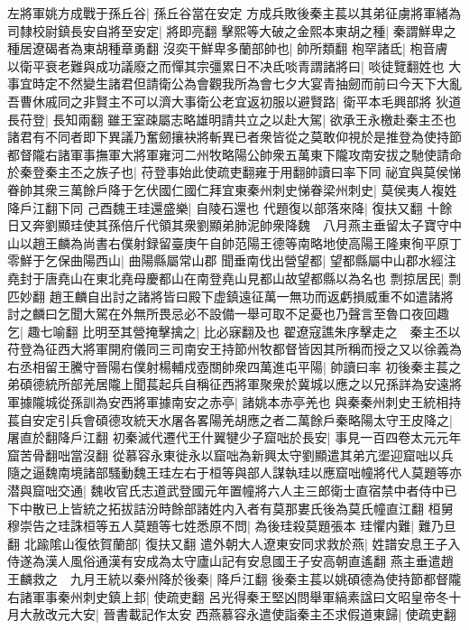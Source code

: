 左將軍姚方成戰于孫丘谷|{
	孫丘谷當在安定}
方成兵敗後秦主萇以其弟征虜將軍緒為司隸校尉鎮長安自將至安定|{
	將即亮翻}
擊熙等大破之金熙本東胡之種|{
	秦謂鮮卑之種居遼碣者為東胡種章勇翻}
沒奕干鮮卑多蘭部帥也|{
	帥所類翻}
枹罕諸氐|{
	枹音膚}
以衛平衰老難與成功議廢之而憚其宗彊累日不决氐啖青謂諸將曰|{
	啖徒覽翻姓也}
大事宜時定不然變生諸君但請衛公為會觀我所為會七夕大宴青抽劒而前曰今天下大亂吾曹休戚同之非賢主不可以濟大事衛公老宜返初服以避賢路|{
	衛平本毛興部將}
狄道長苻登|{
	長知兩翻}
雖王室疎屬志略雄明請共立之以赴大駕|{
	欲承王永檄赴秦主丕也}
諸君有不同者即下異議乃奮劒攘袂將斬異已者衆皆從之莫敢仰視於是推登為使持節都督隴右諸軍事撫軍大將軍雍河二州牧略陽公帥衆五萬東下隴攻南安拔之馳使請命於秦登秦主丕之族子也|{
	苻登事始此使疏吏翻雍于用翻帥讀曰率下同}
祕宜與莫侯悌眷帥其衆三萬餘戶降于乞伏國仁國仁拜宜東秦州刺史悌眷梁州刺史|{
	莫侯夷人複姓降戶江翻下同}
己酉魏王珪還盛樂|{
	自陵石還也}
代題復以部落來降|{
	復扶又翻}
十餘日又奔劉顯珪使其孫倍斤代領其衆劉顯弟肺泥帥衆降魏　八月燕主垂留太子寶守中山以趙王麟為尚書右僕射録留臺庚午自帥范陽王德等南略地使高陽王隆東徇平原丁零鮮于乞保曲陽西山|{
	曲陽縣屬常山郡}
聞垂南伐出營望都|{
	望都縣屬中山郡水經注堯封于唐堯山在東北堯母慶都山在南登堯山見都山故望都縣以為名也}
剽掠居民|{
	剽匹妙翻}
趙王麟自出討之諸將皆曰殿下虚鎮遠征萬一無功而返虧損威重不如遣諸將討之麟曰乞聞大駕在外無所畏忌必不設備一舉可取不足憂也乃聲言至魯口夜回趣乞|{
	趣七喻翻}
比明至其營掩擊擒之|{
	比必寐翻及也}
翟遼寇譙朱序擊走之　秦主丕以苻登為征西大將軍開府儀同三司南安王持節州牧都督皆因其所稱而授之又以徐義為右丞相留王騰守晉陽右僕射楊輔戍壺關帥衆四萬進屯平陽|{
	帥讀曰率}
初後秦主萇之弟碩德統所部羌居隴上聞萇起兵自稱征西將軍聚衆於冀城以應之以兄孫詳為安遠將軍據隴城從孫訓為安西將軍據南安之赤亭|{
	諸姚本赤亭羌也}
與秦秦州刺史王統相持萇自安定引兵會碩德攻統天水屠各畧陽羌胡應之者二萬餘戶秦略陽太守王皮降之|{
	屠直於翻降戶江翻}
初秦滅代遷代王什翼犍少子窟咄於長安|{
	事見一百四卷太元元年窟苦骨翻咄當沒翻}
從慕容永東徙永以窟咄為新興太守劉顯遣其弟亢埿迎窟咄以兵隨之逼魏南境諸部騷動魏王珪左右于桓等與部人謀執珪以應窟咄幢將代人莫題等亦潜與窟咄交通|{
	魏收官氏志道武登國元年置幢將六人主三郎衛士直宿禁中者侍中已下中散已上皆統之拓拔詰汾時餘部諸姓内入者有莫那婁氏後為莫氏幢直江翻}
桓舅穆崇告之珪誅桓等五人莫題等七姓悉原不問|{
	為後珪殺莫題張本}
珪懼内難|{
	難乃旦翻}
北踰隂山復依賀蘭部|{
	復扶又翻}
遣外朝大人遼東安同求救於燕|{
	姓譜安息王子入侍遂為漢人風俗通漢有安成為太守廬山記有安息國王子安高朝直遙翻}
燕主垂遣趙王麟救之　九月王統以秦州降於後秦|{
	降戶江翻}
後秦主萇以姚碩德為使持節都督隴右諸軍事秦州刺史鎮上邽|{
	使疏吏翻}
呂光得秦王堅凶問舉軍縞素諡曰文昭皇帝冬十月大赦改元大安|{
	晉書載記作太安}
西燕慕容永遣使詣秦主丕求假道東歸|{
	使疏吏翻}

